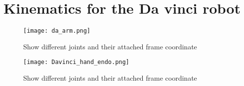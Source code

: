 \section{Kinematics for the Da vinci robot}



\begin{sidewaysfigure}
		\centering
		\texttt{[image: da\_arm.png]}
		\caption{Show different joints and their attached frame coordinate}
		\label{fig:da_ha_en}
\end{sidewaysfigure}



\begin{sidewaysfigure}
		\centering
		\texttt{[image: Davinci\_hand\_endo.png]}
		\caption{Show different joints and their attached frame coordinate}
		\label{fig:da_ha_en}
\end{sidewaysfigure}

